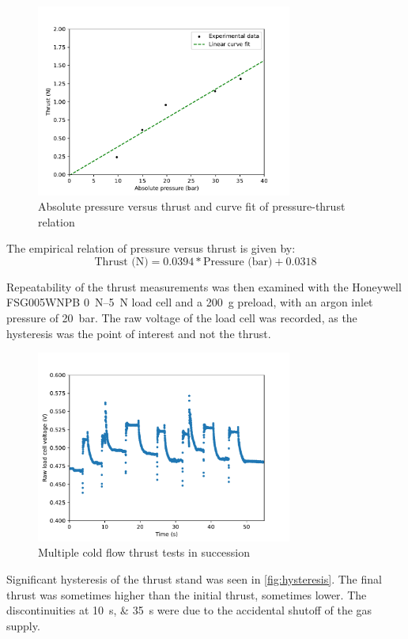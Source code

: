             \begin{figure}[!ht]
                \centering
                \includegraphics[width=0.75\textwidth]{assets/4 experiments/pressure-thrust graph.pdf}
                \caption{Absolute pressure versus thrust and curve fit of pressure-thrust relation}
                \label{fig:coldflow pressure-thrust}
            \end{figure}

            The empirical relation of pressure versus thrust is given by:
            \[
            \text{Thrust (N)} = 0.0394*\text{Pressure (bar)} + 0.0318
            \]

            Repeatability of the thrust measurements was then examined with the Honeywell FSG005WNPB \qtyrange{0}{5}{N} load cell and a \qty{200}{g} preload, with an argon inlet pressure of \qty{20}{bar}. The raw voltage of the load cell was recorded, as the hysteresis was the point of interest and not the thrust.
            \begin{figure}[h]
                \centering
                \includegraphics[width=0.75\textwidth]{assets/4 experiments/hysterisis graph.pdf}
                \caption{Multiple cold flow thrust tests in succession}
                \label{fig:hysteresis}
            \end{figure}
            Significant hysteresis of the thrust stand was seen in \autoref{fig:hysteresis}. The final thrust was sometimes higher than the initial thrust, sometimes lower. The discontinuities at \qtylist{10;35}{s} were due to the accidental shutoff of the gas supply.

